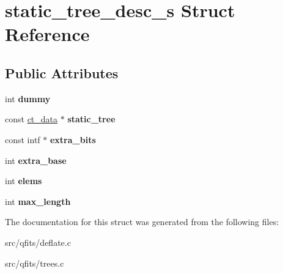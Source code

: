 \hypertarget{structstatic__tree__desc__s}{}\section{static\+\_\+tree\+\_\+desc\+\_\+s Struct Reference}
\label{structstatic__tree__desc__s}
\subsection*{Public Attributes}
\begin{DoxyCompactItemize}
\item 
\mbox{\label{structstatic__tree__desc__s_aa3662e0ed40c86de246851a7a2483308}} 
int {\bfseries dummy}
\item 
\mbox{\label{structstatic__tree__desc__s_a56265073858de4ffe99e32d0f9d38545}} 
const \hyperlink{structct__data__s}{ct\+\_\+data} $\ast$ {\bfseries static\+\_\+tree}
\item 
\mbox{\label{structstatic__tree__desc__s_a4ec9abd624cbf2bfcc48dfb786925986}} 
const intf $\ast$ {\bfseries extra\+\_\+bits}
\item 
\mbox{\label{structstatic__tree__desc__s_a1051cc83d9d410ccf21427df9bd85201}} 
int {\bfseries extra\+\_\+base}
\item 
\mbox{\label{structstatic__tree__desc__s_ab4bad1c091188c43413a09f626a5787f}} 
int {\bfseries elems}
\item 
\mbox{\label{structstatic__tree__desc__s_ae767848725194f63fa9cf08142767ad4}} 
int {\bfseries max\+\_\+length}
\end{DoxyCompactItemize}


The documentation for this struct was generated from the following files\+:\begin{DoxyCompactItemize}
\item 
src/qfits/deflate.\+c\item 
src/qfits/trees.\+c\end{DoxyCompactItemize}
